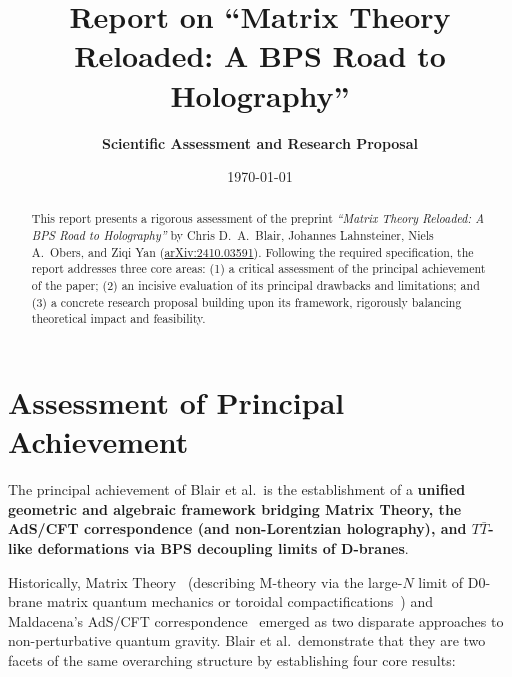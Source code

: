 \documentclass[11pt,a4paper]{article}
\title{\vspace{-1.5em}\Large\textbf{Report on ``Matrix Theory Reloaded: A BPS Road to Holography''}\vspace{-0.3em}}
\author{\textbf{Scientific Assessment and Research Proposal}\vspace{-0.5em}}
\date{\today}
\begin{document}
\maketitle

\begin{abstract}
\noindent This report presents a rigorous assessment of the preprint \emph{``Matrix Theory Reloaded: A BPS Road to Holography''} by Chris D.~A.~Blair, Johannes Lahnsteiner, Niels A.~Obers, and Ziqi Yan (\href{https://arxiv.org/abs/2410.03591}{arXiv:2410.03591}). Following the required specification, the report addresses three core areas: (1) a critical assessment of the principal achievement of the paper; (2) an incisive evaluation of its principal drawbacks and limitations; and (3) a concrete research proposal building upon its framework, rigorously balancing theoretical impact and feasibility.
\end{abstract}

\vspace{-0.5em}
\section{Assessment of Principal Achievement}
\label{sec:achievement}

The principal achievement of Blair et al.\ is the establishment of a \textbf{unified geometric and algebraic framework bridging Matrix Theory, the AdS/CFT correspondence (and non-Lorentzian holography), and $T\bar{T}$-like deformations via BPS decoupling limits of D-branes}. 

Historically, Matrix Theory~\cite{Banks:1996vh} (describing M-theory via the large-$N$ limit of D0-brane matrix quantum mechanics or toroidal compactifications~\cite{Taylor:2001vb}) and Maldacena's AdS/CFT correspondence~\cite{Maldacena:1997re} emerged as two disparate approaches to non-perturbative quantum gravity. Blair et al.\ demonstrate that they are two facets of the same overarching structure by establishing four core results:
\end{document}
